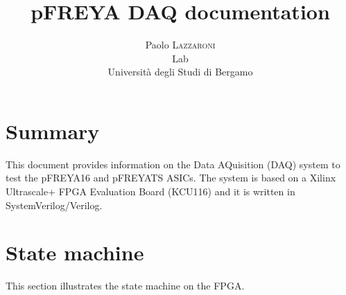 \documentclass[a4paper,twoside]{article}
\title{\fontsize{22}{18}\selectfont \textbf{pFREYA DAQ documentation}}
\author{\fontsize{16}{18}\selectfont Paolo \textsc{Lazzaroni}\\{\textmu}Lab\\Università degli Studi di Bergamo}
\makeatletter
\renewcommand\tableofcontents{%
	\@starttoc{toc}%
}
\makeatother
\begin{document}
	
	\maketitle\thispagestyle{empty} %
	
	\section*{Summary}
	
	This document provides information on the Data AQuisition (DAQ) system to test the pFREYA16 and pFREYATS ASICs. The system is based on a Xilinx Ultrascale+ FPGA Evaluation Board (KCU116) and it is written in SystemVerilog/Verilog.
	
	\tableofcontents
	\clearpage
	
	\section{State machine}
	This section illustrates the state machine on the FPGA.
\end{document}
